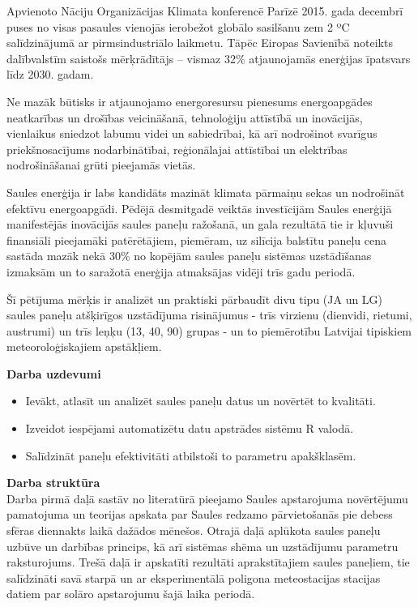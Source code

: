 Apvienoto Nāciju Organizācijas Klimata konferencē Parīzē 2015. gada decembrī puses no visas pasaules vienojās ierobežot globālo sasilšanu zem 2 ºC salīdzinājumā ar pirmsindustriālo laikmetu.
Tāpēc Eiropas Savienībā noteikts dalībvalstīm saistošs mērķrādītājs  –  vismaz 32\%  atjaunojamās enerģijas īpatsvars līdz 2030. gadam.\cite{ES}

Ne mazāk būtisks ir atjaunojamo energoresursu pienesums energoapgādes neatkarības un drošības veicināšanā, tehnoloģiju attīstībā un inovācijās, vienlaikus sniedzot labumu videi un sabiedrībai, kā arī nodrošinot svarīgus priekšnosacījums nodarbinātībai, reģionālajai attīstībai un elektrības nodrošināšanai grūti pieejamās vietās. \cite{ES}

Saules enerģija ir labs kandidāts mazināt klimata pārmaiņu sekas un nodrošināt efektīvu energoapgādi. Pēdējā desmitgadē veiktās investīcijām Saules enerģijā manifestējās inovācijās saules paneļu ražošanā, un gala rezultātā tie ir kļuvuši finansiāli pieejamāki patērētājiem, piemēram, uz silīcija balstītu paneļu cena sastāda mazāk nekā 30\% no kopējām saules paneļu sistēmas uzstādīšanas izmaksām un to saražotā enerģija atmaksājas vidēji trīs gadu periodā.\cite{researchOpp}

Šī pētījuma mērķis ir analizēt un praktiski pārbaudīt divu tipu (JA un LG) saules paneļu atšķirīgos uzstādījuma risinājumus -  trīs virzienu (dienvidi, rietumi, austrumi) un trīs leņķu (13, 40, 90) grupas - un to piemērotību Latvijai tipiskiem meteoroloģiskajiem apstākļiem.

\textbf{Darba uzdevumi}
\begin{itemize}
\item Ievākt, atlasīt un analizēt saules paneļu datus un novērtēt to kvalitāti.
\item Izveidot iespējami automatizētu datu apstrādes sistēmu R valodā.
\item Salīdzināt paneļu efektivitāti atbilstoši to parametru apakšklasēm.
\end{itemize}

\textbf{Darba struktūra}\\
Darba pirmā daļā sastāv no literatūrā pieejamo Saules apstarojuma novērtējumu pamatojuma un teorijas apskata par Saules redzamo pārvietošanās pie debess sfēras diennakts laikā dažādos mēnešos. Otrajā daļā aplūkota saules paneļu uzbūve un darbības princips, kā arī sistēmas shēma un uzstādījumu parametru raksturojums. Trešā daļā ir apskatīti rezultāti aprakstītajiem saules paneļiem, tie salīdzināti savā starpā un ar eksperimentālā poligona meteostacijas stacijas datiem par solāro apstarojumu šajā laika periodā.



